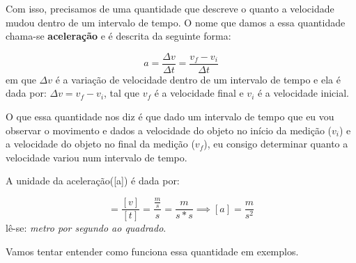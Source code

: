 \documentclass[12pt]{extarticle}
\newcommand{\<}{\langle}
\renewcommand{\>}{\rangle}
\theoremstyle{definition}
\begin{document}
Com isso, precisamos de uma quantidade que descreve o quanto a velocidade mudou dentro de um intervalo de tempo. O nome que damos a essa quantidade chama-se \textbf{aceleração} e é descrita da seguinte forma:

\begin{equation}
    a= \frac{\Delta v}{\Delta t} = \frac{v_f - v_i}{\Delta t}
\end{equation}
em que $\Delta v$ é a variação de velocidade dentro de um intervalo de tempo e ela é dada por: $\Delta v = v_f - v_i$, tal que $v_f$ é a velocidade final e $v_i$ é a velocidade inicial.

O que essa quantidade nos diz é que dado um intervalo de tempo que eu vou observar o movimento e dados a velocidade do objeto no início da medição ($v_i$) e a velocidade do objeto no final da medição ($v_f$), eu consigo determinar quanto a velocidade variou num intervalo de tempo.

A unidade da aceleração([a]) é dada por:

\begin{equation}
    [a] = \frac{[v]}{[t]} = \frac{\frac{m}{s}}{s} = \frac{m}{s*s} \implies [a] = \frac{m}{s^2}
\end{equation}
lê-se: \textit{metro por segundo ao quadrado}.

Vamos tentar entender como funciona essa quantidade em exemplos.
\end{document}
